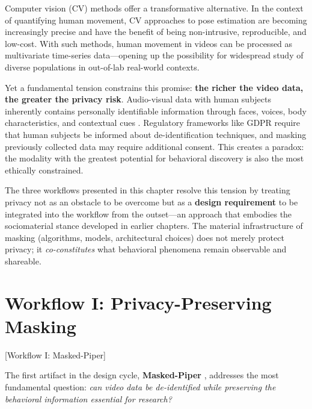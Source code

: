 \documentclass[../main.tex]{subfiles}
\begin{document}
Computer vision (CV) methods offer a transformative alternative. In the context of quantifying human movement, CV approaches to pose estimation are becoming increasingly precise and have the benefit of being non-intrusive, reproducible, and low-cost. With such methods, human movement in videos can be processed as multivariate time-series data---opening up the possibility for widespread study of diverse populations in out-of-lab real-world contexts.

Yet a fundamental tension constrains this promise: \textbf{the richer the video data, the greater the privacy risk}. Audio-visual data with human subjects inherently contains personally identifiable information through faces, voices, body characteristics, and contextual cues \parencite{owoyele2024maskanyone}. Regulatory frameworks like GDPR require that human subjects be informed about de-identification techniques, and masking previously collected data may require additional consent. This creates a paradox: the modality with the greatest potential for behavioral discovery is also the most ethically constrained.

The three workflows presented in this chapter resolve this tension by treating privacy not as an obstacle to be overcome but as a \textbf{design requirement} to be integrated into the workflow from the outset---an approach that embodies the sociomaterial stance developed in earlier chapters. The material infrastructure of masking (algorithms, models, architectural choices) does not merely protect privacy; it \textit{co-constitutes} what behavioral phenomena remain observable and shareable.


\section{Workflow I: Privacy-Preserving Masking}[Workflow I: Masked-Piper]

The first artifact in the design cycle, \textbf{Masked-Piper} \parencite{owoyele2022maskedpiper}, addresses the most fundamental question: \textit{can video data be de-identified while preserving the behavioral information essential for research?}
\end{document}
